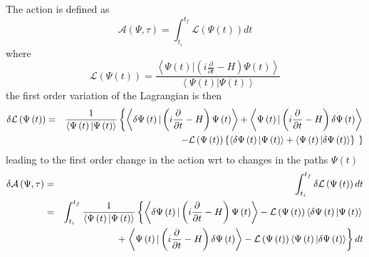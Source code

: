 \documentclass[aps,preprint]{revtex4}
\begin{document}
The action is defined as%
\begin{equation}
\mathcal{A}\left( \Psi ,\tau \right) =\int_{t_{i}}^{t_{f}}\mathcal{L}\left(
\Psi \left( t\right) \right) dt
\end{equation}%
where 
\begin{equation}
\mathcal{L}\left( \Psi \left( t\right) \right) =\frac{\left\langle \Psi
\left( t\right) |\left( i\frac{\partial }{\partial t}-H\right) \Psi \left(
t\right) \right\rangle }{\left\langle \Psi \left( t\right) |\Psi \left(
t\right) \right\rangle }
\end{equation}%
the first order variation of the Lagrangian is then%
\begin{eqnarray}
\delta \mathcal{L}\left( \Psi \left( t\right) \right)  &=&\frac{1}{%
\left\langle \Psi \left( t\right) |\Psi \left( t\right) \right\rangle }%
\left\{ \left\langle \delta \Psi \left( t\right) |\left( i\frac{\partial }{%
\partial t}-H\right) \Psi \left( t\right) \right\rangle +\left\langle \Psi
\left( t\right) |\left( i\frac{\partial }{\partial t}-H\right) \delta \Psi
\left( t\right) \right\rangle \right.   \notag \\
&&\qquad \qquad \qquad \qquad \left. -\mathcal{L}\left( \Psi \left( t\right)
\right) \left\{ \left\langle \delta \Psi \left( t\right) |\Psi \left(
t\right) \right\rangle +\left\langle \Psi \left( t\right) |\delta \Psi
\left( t\right) \right\rangle \right\} \overset{}{\left. {}\right. }\right\} 
\end{eqnarray}%
leading to the first order change in the action wrt to changes in the paths $%
\Psi \left( t\right) $ 
\begin{eqnarray}
\delta \mathcal{A}\left( \Psi ,\tau \right)  &=&\int_{t_{i}}^{t_{f}}\delta 
\mathcal{L}\left( \Psi \left( t\right) \right) dt  \notag \\
&=&\int_{t_{i}}^{t_{f}}\frac{1}{\left\langle \Psi \left( t\right) |\Psi
\left( t\right) \right\rangle }\left\{ \left\langle \delta \Psi \left(
t\right) |\left( i\frac{\partial }{\partial t}-H\right) \Psi \left( t\right)
\right\rangle -\mathcal{L}\left( \Psi \left( t\right) \right) \left\langle
\delta \Psi \left( t\right) |\Psi \left( t\right) \right\rangle \right.  
\notag \\
&&\qquad \qquad +\left. \left\langle \Psi \left( t\right) |\left( i\frac{%
\partial }{\partial t}-H\right) \delta \Psi \left( t\right) \right\rangle -%
\mathcal{L}\left( \Psi \left( t\right) \right) \left\langle \Psi \left(
t\right) |\delta \Psi \left( t\right) \right\rangle \right\} dt
\end{eqnarray}%
\end{document}
